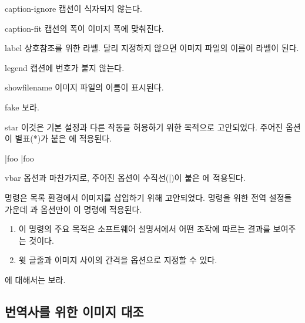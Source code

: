 \documentclass[minted]{hzguide}
\begin{document}
\begin{macros}
\item[caption-ignore] \keyvalueTF
캡션이 식자되지 않는다.

\item[caption-fit] \keyvalueTF
캡션의 폭이 이미지 폭에 맞춰진다.

\item[label] 
상호참조를 위한 라벨. 달리 지정하지 않으면 이미지 파일의 이름이 라벨이 된다.

\item[legend] \keyvalueTF
캡션에 번호가 붙지 않는다.

\item[showfilename] \keyvalueTF
이미지 파일의 이름이 표시된다.

\item[fake] \keyvalueTF
{}\를 보라.

\item[star] 
이것은 기본 설정과 다른 작동을 허용하기 위한 목적으로 고안되었다.
주어진 옵션이 별표(*)가 붙은 \macro{\image*}에 적용된다. 

\begin{code}
  \image|{foo} \image*|{foo}
\end{code}

\item[vbar] 
 옵션과 마찬가지로, 주어진 옵션이 수직선(|)이 붙은 \macro{\image|}에 적용된다. 
\end{macros}

\macro{\listimg} 명령은 목록 환경에서 이미지를 삽입하기 위해 고안되었다. \macro{\image} 명령을 위한 전역 설정들 가운데 과  옵션만이 이 명령에 적용된다.

\begin{coderesult}
\begin{enumerate}
\item 이 명령의 주요 목적은 소프트웨어 설명서에서 어떤 조작에 따르는 결과를 보여주는 것이다.
\item 윗 글줄과 이미지 사이의 간격을 옵션으로 지정할 수 있다.
\end{enumerate}
\end{coderesult}

\macro{\listimg*}에 대해서는 \를 보라.

\subsection{번역사를 위한 이미지 대조}
\end{document}
